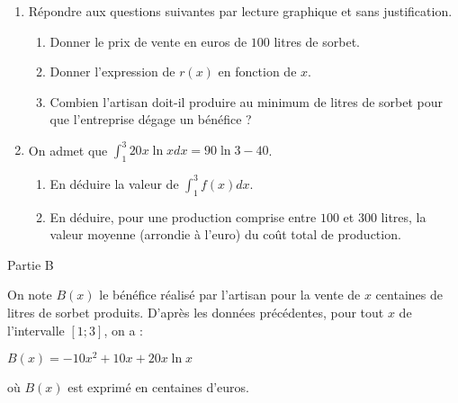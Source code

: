 \begin{center}
\end{center}
\begin{enumerate}
     \item
     Répondre aux questions suivantes par lecture graphique et sans justification.
     \begin{enumerate}[label=\alph*.]
          \item
          Donner le prix de vente en euros de $100$ litres de sorbet.
          \item
          Donner l'expression de $r\left(x\right)$ en fonction de $x$.
          \item
     Combien l'artisan doit-il produire au minimum de litres de sorbet pour que l'entreprise dégage un bénéfice ?\end{enumerate}
     \item
     On admet que $\int_{1}^{3} 20x \ln xdx=90 \ln 3-40$.
     \begin{enumerate}[label=\alph*.]
          \item
          En déduire la valeur de $\int_{1}^{3}f\left(x\right)dx$.
          \item
     En déduire, pour une production comprise entre $100$ et $300$ litres, la valeur moyenne (arrondie à l'euro) du coût total de production.\end{enumerate}
\end{enumerate}
\begin{h3}Partie B\end{h3}
On note $B\left(x\right)$ le bénéfice réalisé par l'artisan pour la vente de $x$ centaines de litres de sorbet produits. D'après les données précédentes, pour tout $x$ de l'intervalle $\left[1 ; 3\right]$, on a :
\par
$B\left(x\right) =-10x^{2}+10x+20x \ln x$
\par
où $B\left(x\right)$ est exprimé en centaines d'euros.
